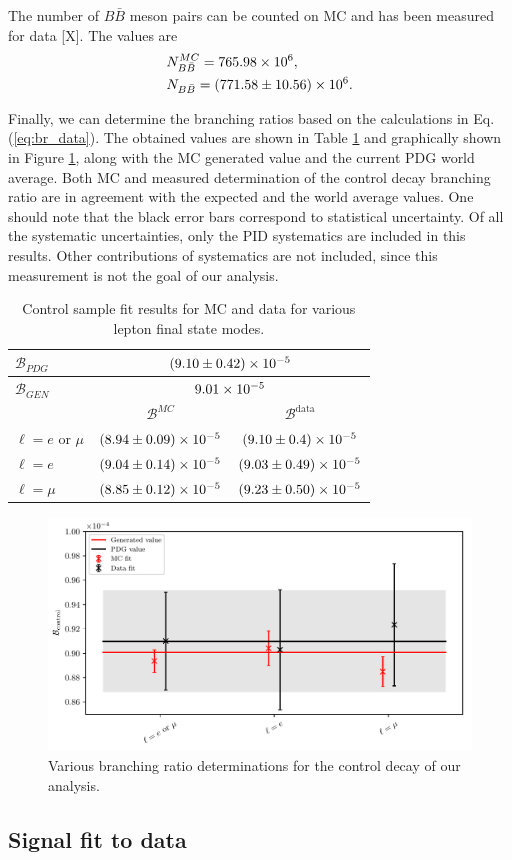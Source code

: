 The number of $B\bar B$ meson pairs can be counted on MC and has been measured for data [X]. The values are
\begin{align*}
&N_{B\bar B}^{MC} = 765.98\times 10^{6},\\
&N_{B\bar B} = (771.58 \pm 10.56)\times 10^{6}.
\end{align*}

Finally, we can determine the branching ratios based on the calculations in Eq. (\ref{eq:br_data}). The obtained values are shown in Table \ref{tab:br_result} and graphically shown in Figure \ref{fig:br_plot}, along with the MC generated value and the current PDG world average. Both MC and measured determination of the control decay branching ratio are in agreement with the expected and the world average values. One should note that the black error bars correspond to statistical uncertainty. Of all the systematic uncertainties, only the PID systematics are included in this results. Other contributions of systematics are not included, since this measurement is not the goal of our analysis.

\begin{table}[!htbp]
	\centering
	\begin{tabular}{|l|c|c|}
		\hline
		$\mathcal{B}_{PDG}$ & \multicolumn{2}{c|}{$(9.10\pm0.42)\times 10^{-5}$} \\
		\hline
     	$\mathcal{B}_{GEN}$ & \multicolumn{2}{c|}{$9.01\times 10^{-5}$} \\
     	\hline
		& $\mathcal{B}^{MC}$ & $\mathcal{B}^{\mathrm{data}}$ \\
		\hline
		$\ell = e$ or $\mu$ & $(8.94\pm0.09)\times 10^{-5}$ & $(9.10\pm0.4)\times 10^{-5}$\\
		\hline
		$\ell = e$ & $(9.04\pm0.14)\times 10^{-5}$ & $(9.03\pm0.49)\times 10^{-5}$ \\
		\hline
		$\ell = \mu$ & $(8.85\pm0.12)\times 10^{-5}$ & $(9.23\pm0.50)\times 10^{-5}$\\
		\hline
	\end{tabular}
	\caption{Control sample fit results for MC and data for various lepton final state modes.}
	\label{tab:br_result}
\end{table}

\begin{figure}[!htbp]
	\centering
	\captionsetup{width=0.8\linewidth}
	\includegraphics[width=\linewidth]{fig/br_plot}
	\caption{Various branching ratio determinations for the control decay of our analysis.}
	\label{fig:br_plot}
\end{figure}

\subsection{Signal fit to data}